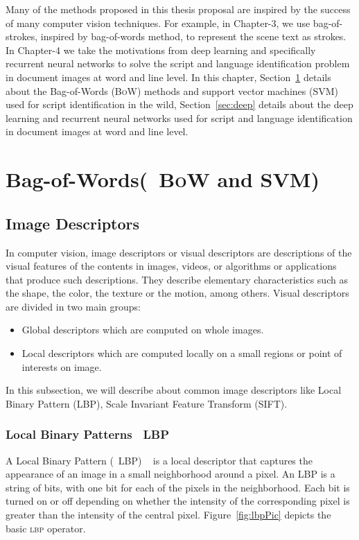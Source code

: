 Many of the methods proposed in this thesis proposal are inspired by the success of many computer vision techniques. For example, in Chapter-3, we use bag-of-strokes, inspired by bag-of-words method, to represent the scene text as strokes. In Chapter-4 we take the motivations from deep learning and specifically recurrent neural networks to solve the script and language identification problem in document images at word and line level. In this chapter, Section~\ref{sec:tools} details about the Bag-of-Words (\textsc{BoW}) methods and support vector machines (\textsc{SVM}) used for script identification in the wild, Section~\ref{sec:deep} details about the deep learning and recurrent neural networks used for script and language identification in document images at word and line level.

\section{Bag-of-Words(~\textsc{BoW} and \textsc{SVM})}
\label{sec:tools}

\subsection{Image Descriptors}
In computer vision, image descriptors or visual descriptors are descriptions of the visual features of the contents in images, videos, or algorithms or applications that produce such descriptions. They describe elementary characteristics such as the shape, the color, the texture or the motion, among others. Visual descriptors are divided in two main groups:
\begin{itemize}
\item Global descriptors which are computed on whole images.
\item Local descriptors which are computed locally on a small regions or point of interests on image.
\end{itemize}

In this subsection, we will describe about common image descriptors like Local Binary Pattern (\textsc{LBP}), Scale Invariant Feature Transform (\textsc{SIFT}).

\subsubsection{Local Binary Patterns ~\textsc{LBP}}
A Local Binary Pattern (~\textsc{LBP}) ~\cite{LBPOjala2002} is a local descriptor that captures the appearance of an image in a small neighborhood around a pixel. An LBP is a string of bits, with one bit for each of the pixels in the neighborhood. Each bit is turned on or off depending on whether the intensity of the corresponding pixel is greater than the intensity of the central pixel. Figure~\ref{fig:lbpPic} depicts the basic \textsc{lbp} operator.


